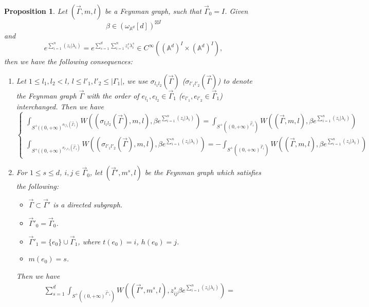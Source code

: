 \documentclass[11pt]{amsart}
\newtheorem{prop}[thm]{Proposition}
\theoremstyle{definition}
\theoremstyle{remark}
\numberwithin{equation}{section}
\begin{document}
\begin{prop}\label{well-defineness}
        Let $(\vec{\Gamma},m,l)$ be a Feynman graph, such that $\vec{\Gamma}_{0}= I$. Given
    $$
    \beta\in (\omega_{\mathbb{A}^{d}}[d])^{\boxtimes I}
    $$
    and
    $$
    e^{\sum\limits_{i=1}^{n}(z_{i}|\lambda_{i})}=e^{\sum\limits_{s=1}^{d}\sum\limits_{i=1}^{n}z^{s}_{i}\lambda^{s}_{i}}\in C^{\infty}((\mathbb{A}^{d})^{ I}\times (\mathbb{A}^{d})^{ I}),
    $$
    then we have the following consequences:
    \begin{enumerate}
        \item Let $1\leq l_{1},l_{2}< l$, $l\leq l'_{1},l'_{2}\leq |\Gamma_{1}|$, we use $\sigma_{l_{1}l_{2}}(\vec{\Gamma})$ ($\sigma_{l'_{1}l'_{2}}(\vec{\Gamma})$) to denote the Feynman graph $\vec{\Gamma}$ with the order of $e_{l_{1}},e_{l_{2}}\in\vec{\Gamma}_{1}$ ($e_{l'_{1}},e_{l'_{2}}\in\vec{\Gamma}_{1}$) interchanged. Then we have
        $$
        \begin{cases}
            \int_{S^{+}((0,+\infty)^{\sigma_{l_{1}l_{2}}(\vec{\Gamma}_{1})}}W((\sigma_{l_{1}l_{2}}(\vec{\Gamma}),m,l),\beta e^{\sum\limits_{i=1}^{n}(z_{i}|\lambda_{i})})=
        \int_{S^{+}((0,+\infty)^{\vec{\Gamma}_{1}})}W((\vec{\Gamma},m,l),\beta e^{\sum\limits_{i=1}^{n}(z_{i}|\lambda_{i})})\\
        \int_{S^{+}((0,+\infty)^{\sigma_{l'_{1}l'_{2}}(\vec{\Gamma}_{1})}}W((\sigma_{l'_{1}l'_{2}}(\vec{\Gamma}),m,l),\beta e^{\sum\limits_{i=1}^{n}(z_{i}|\lambda_{i})})=
        -\int_{S^{+}((0,+\infty)^{\vec{\Gamma}_{1}})}W((\vec{\Gamma},m,l),\beta e^{\sum\limits_{i=1}^{n}(z_{i}|\lambda_{i})})
        \end{cases}
        $$
        \item For $1\leq s\leq d$, $i,j\in \vec{\Gamma}_{0}$, let $(\vec{\Gamma}',m^{s},l)$ be the Feynman graph which satisfies the following:
        \begin{itemize}
            \item $\vec{\Gamma}\subset\vec{\Gamma}'$ is a directed subgraph.
            \item $\vec{\Gamma}'_{0}=\vec{\Gamma}_{0}$.
            \item $\vec{\Gamma}'_{1}=\{e_{0}\}\cup\vec{\Gamma}_{1}$, where $t(e_{0})=i$, $h(e_{0})=j$.
            \item $m(e_{0})=s$.
        \end{itemize}
        Then we have
        \begin{align}\label{well-defined formula}
        \sum_{s=1}^{d}\int_{S^{+}((0,+\infty)^{\vec{\Gamma}'_{1}})}W((\vec{\Gamma}',m^{s},l),z_{ij}^{s}\beta e^{\sum\limits_{i=1}^{n}(z_{i}|\lambda_{i})})=

\end{align}
\end{enumerate}
\end{prop}
\end{document}
